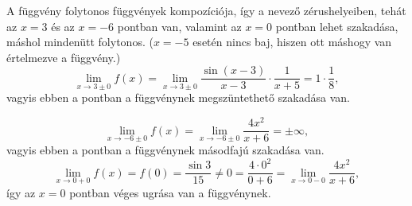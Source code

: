 \documentclass[11pt]{scrartcl}
\begin{document}
A függvény folytonos függvények kompozíciója, így a nevező zérushelyeiben,
tehát az $x = 3$ és az $x = -6$ pontban van, valamint az $x = 0$ pontban lehet
szakadása, máshol mindenütt folytonos. ($x = -5$ esetén nincs
baj, hiszen ott máshogy van értelmezve a függvény.)
\[
	\lim_{x \to 3 \pm 0} f(x)
	= \lim_{x \to 3 \pm 0} \frac{\sin(x - 3)}{x - 3} \cdot \frac{1}{x + 5}
	= 1 \cdot \frac{1}{8},
\]
vagyis ebben a pontban a függvénynek megszüntethető szakadása van.

\[
	\lim_{x \to -6 \pm 0} f(x)
	= \lim_{x \to -6 \pm 0} \frac{4x^2}{x + 6}
	= \pm \infty,
\]
vagyis ebben a pontban a függvénynek másodfajú szakadása van.
\[
	\lim_{x \to 0 + 0} f(x)
	= f(0)
	= \frac{\sin 3}{15}
	\ne 0
	= \frac{4 \cdot 0^2}{0 + 6}
	= \lim_{x \to 0 - 0} \frac{4x^2}{x + 6},
\]
így az $x = 0$ pontban véges ugrása van a függvénynek.
\end{document}
